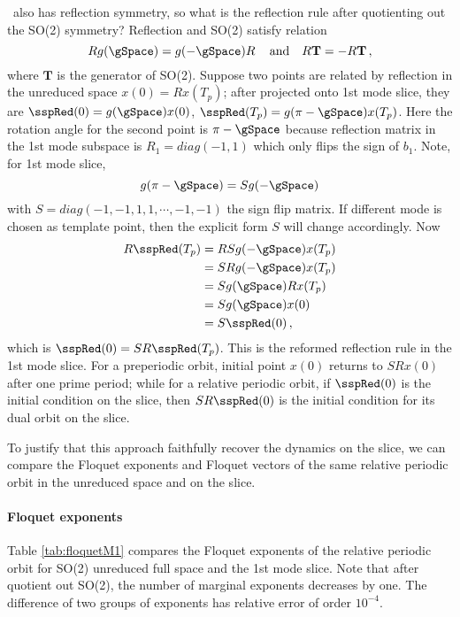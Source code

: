 \KSe\ also has reflection symmetry, so what is the reflection rule after
quotienting out the SO(2) symmetry? Reflection and SO(2) satisfy relation
\[
Rg(\gSpace) = g(-\gSpace)R \,\quad \text{and}\quad R\mathbf{T}=-R\mathbf{T}
\,,
\]
where $\mathbf{T}$ is the generator of SO(2). Suppose two points are related by reflection
in the unreduced space $x(0)=Rx(T_p)$; after projected onto 1st mode slice, they are
$\sspRed(0)=g(\gSpace)x(0)$, $\sspRed(T_p)=g(\pi-\gSpace)x(T_p)$. Here the rotation angle
for the second point is $\pi-\gSpace$ because reflection matrix in the 1st mode subspace is
$R_1=diag(-1,1)$ which only flips the sign of $b_1$. Note, for 1st mode slice,
\[
g(\pi-\gSpace) = Sg(-\gSpace)
\]
with $S=diag(-1,-1,1,1,\cdots,-1,-1)$ the sign flip matrix. If different mode is chosen as
template point, then the explicit form $S$ will change accordingly. Now
\begin{align*}
  R\sspRed(T_p) & = RSg(-\gSpace)x(T_p) \\
  & = S Rg(-\gSpace)x(T_p)  \\
  & = Sg(\gSpace)Rx(T_p) \\
  & = Sg(\gSpace)x(0) \\
  & = S\sspRed(0)
  \,,
\end{align*}
which is $\sspRed(0)=SR\sspRed(T_p)$. This is the reformed reflection rule in the 1st mode
slice. For a preperiodic orbit, initial point $x(0)$ returns to $SRx(0)$ after one prime period;
while for a relative periodic orbit, if $\sspRed(0)$ is the initial condition on the slice, then
$SR\sspRed(0)$ is the initial condition for its dual orbit on the slice.

To justify that this approach faithfully recover the dynamics on the slice,
we can compare the Floquet exponents and Floquet vectors of the same
relative periodic orbit  in the unreduced space and on the
slice.

\paragraph{Floquet exponents}
Table \ref{tab:floquetM1} compares the Floquet exponents of the relative periodic orbit
 for SO(2) unreduced full space and the 1st mode slice. Note that after
quotient out SO(2), the number of marginal exponents decreases by one. The difference
of two groups of exponents has relative error of order $10^{-4}$.

